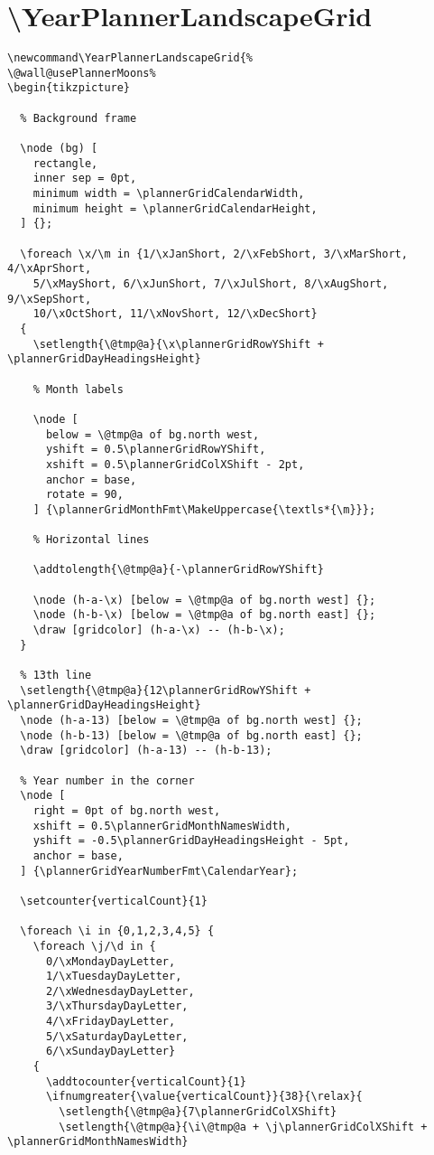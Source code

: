 \documentclass[11pt,oneside]{memoir-article}
\begin{document}
\section{\textbackslash YearPlannerLandscapeGrid}
\label{sec:orgce2473c}

\begin{verbatim}
\newcommand\YearPlannerLandscapeGrid{%
\@wall@usePlannerMoons%
\begin{tikzpicture}

  % Background frame

  \node (bg) [
    rectangle,
    inner sep = 0pt,
    minimum width = \plannerGridCalendarWidth,
    minimum height = \plannerGridCalendarHeight,
  ] {};

  \foreach \x/\m in {1/\xJanShort, 2/\xFebShort, 3/\xMarShort, 4/\xAprShort,
    5/\xMayShort, 6/\xJunShort, 7/\xJulShort, 8/\xAugShort, 9/\xSepShort,
    10/\xOctShort, 11/\xNovShort, 12/\xDecShort}
  {
    \setlength{\@tmp@a}{\x\plannerGridRowYShift + \plannerGridDayHeadingsHeight}

    % Month labels

    \node [
      below = \@tmp@a of bg.north west,
      yshift = 0.5\plannerGridRowYShift,
      xshift = 0.5\plannerGridColXShift - 2pt,
      anchor = base,
      rotate = 90,
    ] {\plannerGridMonthFmt\MakeUppercase{\textls*{\m}}};

    % Horizontal lines

    \addtolength{\@tmp@a}{-\plannerGridRowYShift}

    \node (h-a-\x) [below = \@tmp@a of bg.north west] {};
    \node (h-b-\x) [below = \@tmp@a of bg.north east] {};
    \draw [gridcolor] (h-a-\x) -- (h-b-\x);
  }

  % 13th line
  \setlength{\@tmp@a}{12\plannerGridRowYShift + \plannerGridDayHeadingsHeight}
  \node (h-a-13) [below = \@tmp@a of bg.north west] {};
  \node (h-b-13) [below = \@tmp@a of bg.north east] {};
  \draw [gridcolor] (h-a-13) -- (h-b-13);

  % Year number in the corner
  \node [
    right = 0pt of bg.north west,
    xshift = 0.5\plannerGridMonthNamesWidth,
    yshift = -0.5\plannerGridDayHeadingsHeight - 5pt,
    anchor = base,
  ] {\plannerGridYearNumberFmt\CalendarYear};

  \setcounter{verticalCount}{1}

  \foreach \i in {0,1,2,3,4,5} {
    \foreach \j/\d in {
      0/\xMondayDayLetter,
      1/\xTuesdayDayLetter,
      2/\xWednesdayDayLetter,
      3/\xThursdayDayLetter,
      4/\xFridayDayLetter,
      5/\xSaturdayDayLetter,
      6/\xSundayDayLetter}
    {
      \addtocounter{verticalCount}{1}
      \ifnumgreater{\value{verticalCount}}{38}{\relax}{
        \setlength{\@tmp@a}{7\plannerGridColXShift}
        \setlength{\@tmp@a}{\i\@tmp@a + \j\plannerGridColXShift + \plannerGridMonthNamesWidth}


\end{verbatim}
\end{document}
